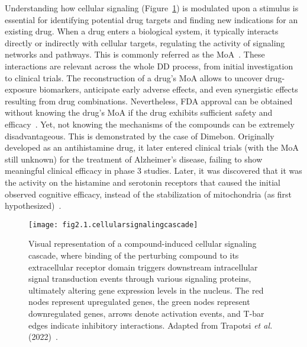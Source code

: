 Understanding how cellular signaling (Figure~\ref{fig:fig2.1.cellularsignalingcascade}) is modulated upon a stimulus is essential for identifying potential drug targets and finding new indications for an existing drug. 
When a drug enters a biological system, it typically interacts directly or indirectly with cellular targets, regulating the activity of signaling networks and pathways. 
This is commonly referred as the \gls{MoA}~\cite{RN52, RN53}. These interactions are relevant across the whole \gls{DD} process, from initial investigation to clinical trials.
The reconstruction of a drug's \gls{MoA} allows to uncover drug-exposure biomarkers, anticipate early adverse effects, and even synergistic effects resulting from drug combinations. 
Nevertheless, FDA approval can be obtained without knowing the drug's \gls{MoA} if the drug exhibits sufficient safety and efficacy~\cite{RN38, RN68}. 
Yet, not knowing the mechanisms of the compounds can be extremely disadvantageous. This is demonstrated by the case of Dimebon. 
Originally developed as an antihistamine drug, it later entered clinical trials (with the \gls{MoA} still unknown) for the treatment of Alzheimer's disease, failing to show meaningful clinical efficacy in phase 3 studies. 
Later, it was discovered that it was the activity on the histamine and serotonin receptors that caused the initial observed cognitive efficacy, instead of the stabilization of mitochondria (as first hypothesized)~\cite{RN38, RN69}.

\begin{figure}[htbp]
    \centering
    \texttt{[image: fig2.1.cellularsignalingcascade]}
    \caption[Visual representation of a compound-induced cellular signaling cascade.]{Visual representation of a compound-induced cellular signaling cascade, where binding of the perturbing compound to its extracellular receptor domain triggers downstream intracellular signal transduction events through various signaling proteins, ultimately altering gene expression levels in the nucleus. The red nodes represent upregulated genes, the green nodes represent downregulated genes, arrows denote activation events, and T-bar edges indicate inhibitory interactions. Adapted from Trapotsi \textit{et al.} (2022)~\cite{RN38}.}
    \label{fig:fig2.1.cellularsignalingcascade}
\end{figure}

